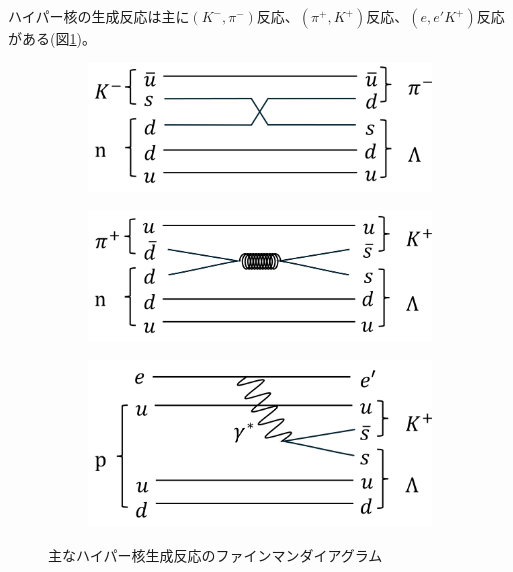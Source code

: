 \documentclass[a4paper,11pt,uplatex]{jsbook}
\begin{document}
ハイパー核の生成反応は主に$(K^-, \pi^-)$反応、$(\pi^+, K^+)$反応、$(e,e'K^+)$反応がある(図\ref{fig:production})。
\begin{figure}[h]
  \centering
  \begin{subfigure}[b]{0.47\linewidth}
    \centering
    \includegraphics[width=\linewidth]{image/1-Kpi.png}
  \end{subfigure}
  \hfill
  \begin{subfigure}[b]{0.47\linewidth}
    \centering
    \includegraphics[width=\linewidth]{image/1-piK.png}
  \end{subfigure}
  \begin{subfigure}[b]{0.5\linewidth}
    \centering
    \includegraphics[width=\linewidth]{image/1-eeK.png}
  \end{subfigure}
  \caption[主なハイパー核生成反応のファインマンダイアグラム]{主なハイパー核生成反応のファインマンダイアグラム}
  \label{fig:production}
\end{figure}
\end{document}
